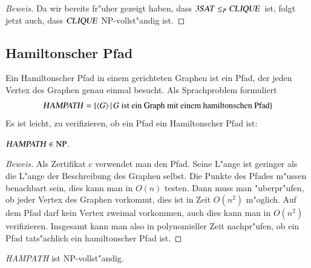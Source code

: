 \begin{proof}[Beweis]
Da wir bereits fr"uher gezeigt haben, dass
$\text{\textsl{3SAT}}\le_P\text{\textsl{CLIQUE}}$ ist, folgt jetzt auch,
dass $\text{\textsl{CLIQUE}}$ NP-vollst"andig ist.
\end{proof}

\subsection{Hamiltonscher Pfad}
Ein Hamiltonscher Pfad in einem gerichteten Graphen ist ein Pfad, der jeden
Vertex des Graphen genau einmal besucht. Als Sprachproblem formuliert 
\[
\text{\textsl{HAMPATH}}
=\{\langle G\rangle\,|\,\text{$G$ ist ein Graph mit einem hamiltonschen Pfad}\}
\]
Es ist leicht, zu verifizieren, ob
ein Pfad ein Hamiltonscher Pfad ist:
\begin{satz} $\text{\textsl{HAMPATH}}\in\text{NP}$.
\end{satz}

\begin{proof}[Beweis]
Als Zertifikat $c$ verwendet man den Pfad. Seine L"ange ist geringer
als die L"ange der Beschreibung des Graphen selbst.
Die Punkte des Pfades m"ussen benachbart sein, dies kann man in 
$O(n)$ testen.
Dann muss man "uberpr"ufen, ob jeder Vertex des Graphen vorkommt,
dies ist in Zeit $O(n^2)$ m"oglich. Auf dem Pfad darf kein Vertex
zweimal vorkommen, auch dies kann man in $O(n^2)$ verifizieren.
Insgesamt kann man also in polynomieller Zeit nachpr"ufen, ob ein
Pfad tats"achlich ein hamiltonscher Pfad ist.
\end{proof}

\begin{satz} \textsl{HAMPATH} ist NP-vollst"andig.
\end{satz}

